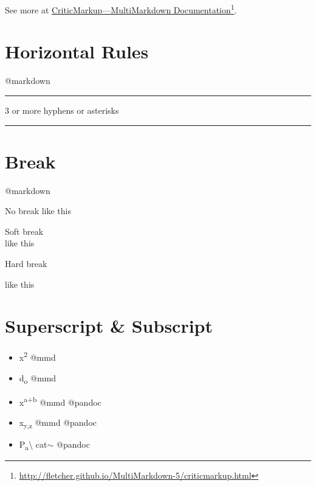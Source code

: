 See more at \href{http://fletcher.github.io/MultiMarkdown-5/criticmarkup.html}{CriticMarkup---MultiMarkdown Documentation}\footnote{\href{http://fletcher.github.io/MultiMarkdown-5/criticmarkup.html}{http:/\slash fletcher.github.io\slash MultiMarkdown-5\slash criticmarkup.html}}.

\section{Horizontal Rules}
\label{horizontalrules}

@markdown

\begin{center}\rule{3in}{0.4pt}\end{center}


3 or more hyphens or asterisks

\begin{center}\rule{3in}{0.4pt}\end{center}


\section{Break}
\label{break}

@markdown

No break
like this

Soft break\\
like this

Hard break

like this

\section{Superscript \& Subscript}
\label{superscriptsubscript}

\begin{itemize}
\item x\textsuperscript{2} @mmd

\item d\textsubscript{o} @mmd

\item x\textsuperscript{a+b} @mmd @pandoc

\item x\textsubscript{y,z} @mmd @pandoc

\item P\textsubscript{a}\textbackslash{} cat\ensuremath{\sim} @pandoc

\end{itemize}


